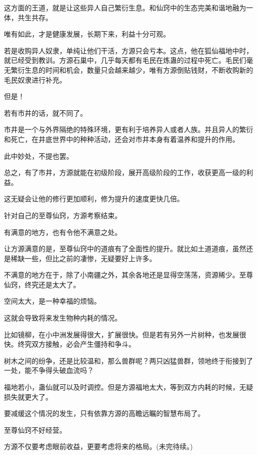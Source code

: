 \begin{this_body}
这方面的王道，就是让这些异人自己繁衍生息。和仙窍中的生态完美和谐地融为一体，共生共存。

唯有如此，才是健康发展，长期下来，利益十分可观。

若是收购异人奴隶，单纯让他们干活，方源只会亏本。这点，他在狐仙福地中时，就已经受到教训。方源石巢中，几乎每天都有毛民在炼蛊的过程中死亡。毛民们毫无繁衍生息的时间和机会，数量只会越来越少，唯有方源倒贴钱财，不断收购新的毛民奴隶进行补充。

但是！

若有市井的话，就不同了。

市井是一个与外界隔绝的特殊环境，更有利于培养异人或者人族。并且异人的繁衍和死亡，在井底世界中的种种活动，还会对市井本身有着温养和提升的作用。

此中妙处，不提也罢。

总之，有了市井，方源就能在初级阶段，展开高级阶段的工作，收获更高一级的利益。

这无疑会让他的修行更加顺利，修为提升的速度更快几倍。

针对自己的至尊仙窍，方源考察结束。

有满意的地方，也有令他不满意之处。

让方源满意的是，至尊仙窍中的道痕有了全面性的提升。就比如土道道痕，虽然还是稀缺一些，但比之前的凄惨，无疑要好上许多。

不满意的地方在于，除了小南疆之外，其余各地还是显得空荡荡，资源稀少。至尊仙窍，终究还是太大了。

空间太大，是一种幸福的烦恼。

这就会导致将来发生物种内耗的情况。

比如镜柳，在小中洲发展得很大，扩展很快。但是若有另外一片树种，也发展很快。终究双方接触，必会产生僵持和争斗。

树木之间的纷争，还是比较温和，那么兽群呢？两只凶猛兽群，领地终于衔接到了一处，能不争得头破血流吗？

福地若小，蛊仙就可以及时调控。但是方源福地太大，等到双方内耗的时候，无疑损失就更大了。

要减缓这个情况的发生，只有依靠方源的高瞻远瞩的智慧布局了。

至尊仙窍不好经营。

方源不仅要考虑眼前收益，更要考虑将来的格局。(未完待续。)

\end{this_body}

